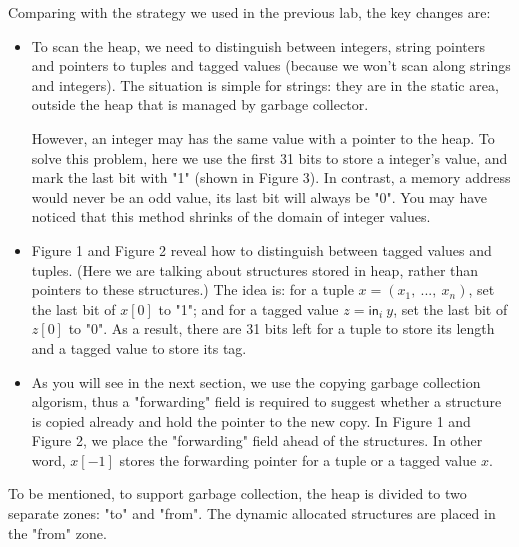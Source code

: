\documentclass{article}
\theoremstyle{definition}
\theoremstyle{remark}
\numberwithin{equation}{section}
\begin{document}
Comparing with the strategy we used in the previous lab, the key changes are:
\begin{itemize}
  \item To scan the heap, we need to distinguish between integers, string pointers and
  pointers to tuples and tagged values (because we won't scan along strings and integers).
   The situation is simple for strings: they are
  in the static area, outside the heap that is managed by garbage collector.

  However, an integer may has the same value with a pointer to the heap.
  To solve this problem,
  here we use the first 31 bits to store a integer's value, and mark the last bit with "1"
  (shown in Figure 3). In contrast, a memory address would never be an odd value,
   its last bit will always be "0". You may have noticed that this method shrinks
   of the domain of integer values.
  \item Figure 1 and Figure 2 reveal how to distinguish between tagged values and tuples.
  (Here we are talking about structures stored in heap, rather than pointers to these
  structures.) The idea is: for a tuple $x=(x_1,\ ...,\ x_n)$, set the last bit of $x[0]$
  to "1"; and for a tagged value $z=\textsf{in}_i\ y$, set the last bit of $z[0]$
  to "0". As a result, there are 31 bits left for a tuple to store its length and a
  tagged value to store its tag.
  \item As you will see in the next section, we use the copying garbage collection
  algorism, thus a "forwarding" field is required to suggest whether a structure is
  copied already and hold the pointer to the new copy. In Figure 1 and Figure 2,
  we place the "forwarding" field ahead of the structures. In other word, $x[-1]$ stores
  the forwarding pointer for a tuple or a tagged value $x$.
\end{itemize}

To be mentioned, to support garbage collection, the heap is divided to two separate zones:
 "to" and "from". The dynamic allocated structures are placed in the "from" zone. \\

$\ $\\
\end{document}
